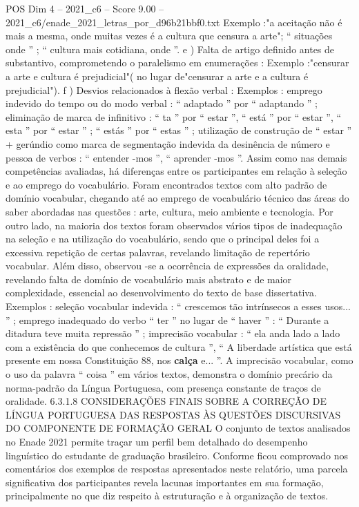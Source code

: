 \begin{textsample}{POS Dim 4 – 2021\_c6 – Score 9.00 – 2021\_c6/enade\_2021\_letras\_por\_d96b21bbf0.txt}
Exemplo :"a aceitação não é mais a mesma, onde muitas vezes é a cultura que censura a arte"; “ situações onde ” ; “ cultura mais cotidiana, onde ”. e ) Falta de artigo definido antes de substantivo, comprometendo o paralelismo em enumerações : Exemplo :"censurar a arte e cultura é prejudicial"( no lugar de"censurar a arte e a cultura é prejudicial"). f ) Desvios relacionados à flexão verbal : Exemplos : emprego indevido do tempo ou do modo verbal : “ adaptado ” por “ adaptando ” ; eliminação de marca de infinitivo : “ ta ” por “ estar ”, “ está ” por “ estar ”, “ esta ” por “ estar ” ; “ estás ” por “ estas ” ; utilização de construção de “ estar ” + gerúndio como marca de segmentação indevida da desinência de número e pessoa de verbos : “ entender -mos ”, “ aprender -mos ”.
Assim como nas demais competências avaliadas, há diferenças entre os participantes em relação à seleção e ao emprego do vocabulário.
Foram encontrados textos com alto padrão de domínio vocabular, chegando até ao emprego de vocabulário técnico das áreas do saber abordadas nas questões : arte, cultura, meio ambiente e tecnologia.
Por outro lado, na maioria dos textos foram observados vários tipos de inadequação na seleção e na utilização do vocabulário, sendo que o principal deles foi a excessiva repetição de certas palavras, revelando limitação de repertório vocabular.
Além disso, observou -se a ocorrência de expressões da oralidade, revelando falta de domínio de vocabulário mais abstrato e de maior complexidade, essencial ao desenvolvimento do texto de base dissertativa.
Exemplos : seleção vocabular indevida : “ crescemos tão intrínsecos a esses usos... ” ; emprego inadequado do verbo “ ter ” no lugar de “ haver ” : “ Durante a ditadura teve muita repressão ” ; imprecisão vocabular : “ ela anda lado a lado com a existência do que conhecemos de cultura ”, “ A liberdade artística que está presente em nossa Constituição 88, nos \textbf{calça} e... ”.
A imprecisão vocabular, como o uso da palavra “ coisa ” em vários textos, demonstra o domínio precário da norma-padrão da Língua Portuguesa, com presença constante de traços de oralidade. 6.3.1.8 CONSIDERAÇÕES FINAIS SOBRE A CORREÇÃO DE LÍNGUA PORTUGUESA DAS RESPOSTAS ÀS QUESTÕES DISCURSIVAS DO COMPONENTE DE FORMAÇÃO GERAL O conjunto de textos analisados no Enade 2021 permite traçar um perfil bem detalhado do desempenho linguístico do estudante de graduação brasileiro.
Conforme ficou comprovado nos comentários dos exemplos de respostas apresentados neste relatório, uma parcela significativa dos participantes revela lacunas importantes em sua formação, principalmente no que diz respeito à estruturação e à organização de textos.

\end{textsample}
